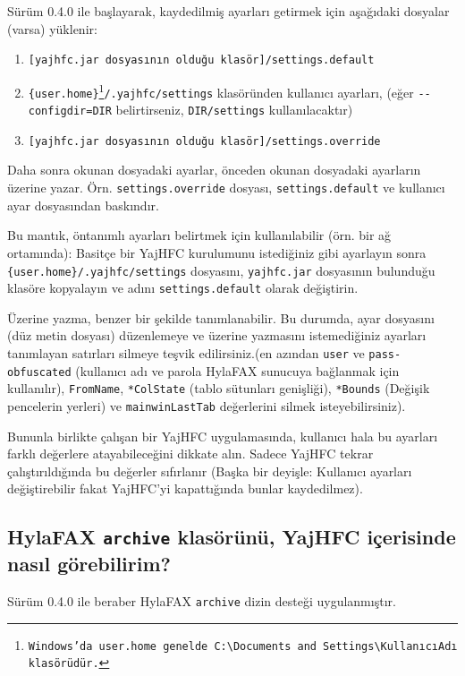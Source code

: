 \documentclass[a4paper,10pt]{scrartcl}
\begin{document}
Sürüm 0.4.0 ile başlayarak, kaydedilmiş ayarları getirmek için aşağıdaki dosyalar (varsa) yüklenir:
\begin{enumerate}
 \item \texttt{[yajhfc.jar dosyasının olduğu klasör]/settings.default}
 \item \texttt{\{user.home\}\footnote{Windows'da \texttt{user.home} genelde \texttt{C:\textbackslash Documents and Settings\textbackslash KullanıcıAdı klasörüdür}.}/.yajhfc/settings} klasöründen kullanıcı ayarları, (eğer \texttt{-{-}configdir=DIR} belirtirseniz, \texttt{DIR/settings} kullanılacaktır)
 \item \texttt{[yajhfc.jar dosyasının olduğu klasör]/settings.override}
\end{enumerate}

Daha sonra okunan dosyadaki ayarlar, önceden okunan dosyadaki ayarların üzerine yazar. Örn. \texttt{settings.override} dosyası, \texttt{settings.default} ve kullanıcı ayar dosyasından baskındır.
\medskip

Bu mantık, öntanımlı ayarları belirtmek için kullanılabilir (örn. bir ağ ortamında):
Basitçe bir YajHFC kurulumunu istediğiniz gibi ayarlayın sonra \texttt{\{user.home\}/.yajhfc/settings} dosyasını, \texttt{yajhfc.jar} dosyasının bulunduğu klasöre kopyalayın ve adını \texttt{settings.default} olarak değiştirin.
\medskip

Üzerine yazma, benzer bir şekilde tanımlanabilir. Bu durumda, ayar dosyasını (düz metin dosyası) düzenlemeye ve üzerine yazmasını istemediğiniz ayarları tanımlayan satırları silmeye teşvik edilirsiniz.(en azından \texttt{user} ve \texttt{pass-obfuscated} (kullanıcı adı ve parola HylaFAX sunucuya bağlanmak için kullanılır), \texttt{FromName}, \texttt{*ColState} (tablo sütunları genişliği), \texttt{*Bounds} (Değişik pencelerin yerleri) ve \texttt{mainwinLastTab} değerlerini silmek isteyebilirsiniz).

Bununla birlikte çalışan bir YajHFC uygulamasında, kullanıcı hala bu ayarları farklı değerlere atayabileceğini dikkate alın.
Sadece YajHFC tekrar çalıştırıldığında bu değerler sıfırlanır (Başka bir deyişle: Kullanıcı ayarları değiştirebilir fakat YajHFC'yi kapattığında bunlar kaydedilmez).

\subsection{HylaFAX \texttt{archive} klasörünü, YajHFC içerisinde nasıl görebilirim?}

Sürüm 0.4.0 ile beraber HylaFAX \texttt{archive} dizin desteği uygulanmıştır.
\end{document}
